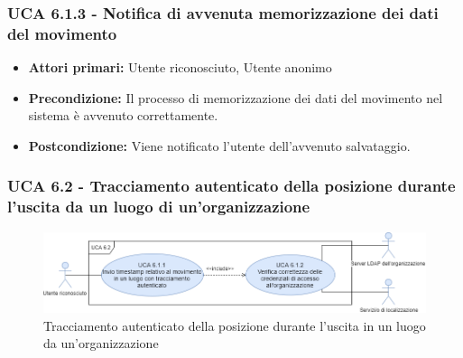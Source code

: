 \subsubsection{UCA 6.1.3 - Notifica di avvenuta memorizzazione dei dati del movimento}
\begin{itemize}
	\item \textbf{Attori primari:} Utente riconosciuto, Utente anonimo
	\item \textbf{Precondizione:} Il processo di memorizzazione dei dati del movimento nel sistema è avvenuto correttamente.
	\item \textbf{Postcondizione:} Viene notificato l'utente dell'avvenuto salvataggio.
\end{itemize}


\subsubsection{UCA 6.2 - Tracciamento autenticato della posizione durante l'uscita da un luogo di un'organizzazione}

\begin{figure}[h]
	\centering
	\includegraphics[scale=0.4, center]{sezioni/UseCase/Immagini/UCA6.2.png}
	\caption{Tracciamento autenticato della posizione durante l'uscita in un luogo da un'organizzazione}
\end{figure} 

